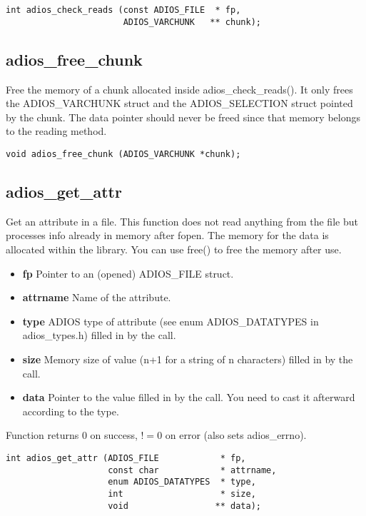 \begin{lstlisting}[alsolanguage=C]
int adios_check_reads (const ADIOS_FILE  * fp, 
                       ADIOS_VARCHUNK   ** chunk);
\end{lstlisting}

\subsection{adios\_free\_chunk}
Free the memory of a chunk allocated inside adios\_check\_reads().
It only frees the ADIOS\_VARCHUNK struct and the ADIOS\_SELECTION struct
pointed by the chunk. The data pointer should never be freed since
that memory belongs to the reading method.

\begin{lstlisting}[alsolanguage=C]
void adios_free_chunk (ADIOS_VARCHUNK *chunk);
\end{lstlisting}



\subsection{adios\_get\_attr}
Get an attribute in a file.
This function does not read anything from the file but processes info
already in memory after fopen.
The memory for the data is allocated within the library.
You can use free() to free the memory after use.

\begin{itemize}
\item{\bf fp}       Pointer to an (opened) ADIOS\_FILE struct.
\item{\bf attrname} Name of the attribute.
\item{\bf type}    ADIOS type of attribute (see enum ADIOS\_DATATYPES in adios\_types.h) filled in by the call. 
\item{\bf size}     Memory size of value (n+1 for a string of n characters) filled in by the call. 
\item{\bf data}    Pointer to the value filled in by the call. You need to cast it afterward according to the type.
\end{itemize}

Function returns 0 on success, $!=0$ on error (also sets adios\_errno).

\begin{lstlisting}[alsolanguage=C]
int adios_get_attr (ADIOS_FILE            * fp,
                    const char            * attrname,
                    enum ADIOS_DATATYPES  * type,
                    int                   * size,
                    void                 ** data);

\end{lstlisting}



